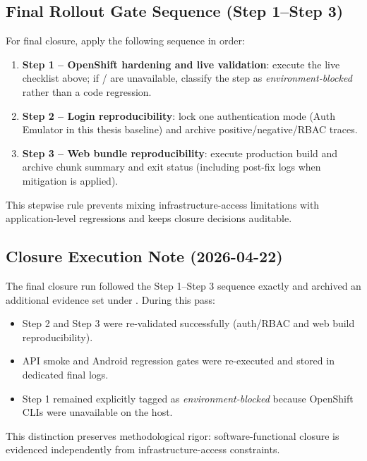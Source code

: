 \subsection{Final Rollout Gate Sequence (Step 1--Step 3)}
For final closure, apply the following sequence in order:
\begin{enumerate}
    \item \textbf{Step 1 -- OpenShift hardening and live validation}: execute the live checklist above; if / are unavailable, classify the step as \emph{environment-blocked} rather than a code regression.
    \item \textbf{Step 2 -- Login reproducibility}: lock one authentication mode (Auth Emulator in this thesis baseline) and archive positive/negative/RBAC traces.
    \item \textbf{Step 3 -- Web bundle reproducibility}: execute production build and archive chunk summary and exit status (including post-fix logs when mitigation is applied).
\end{enumerate}

This stepwise rule prevents mixing infrastructure-access limitations with application-level regressions and keeps closure decisions auditable.

\subsection{Closure Execution Note (2026-04-22)}
The final closure run followed the Step 1--Step 3 sequence exactly and archived an additional evidence set under . During this pass:
\begin{itemize}
    \item Step 2 and Step 3 were re-validated successfully (auth/RBAC and web build reproducibility).
    \item API smoke and Android regression gates were re-executed and stored in dedicated final logs.
    \item Step 1 remained explicitly tagged as \emph{environment-blocked} because OpenShift CLIs were unavailable on the host.
\end{itemize}

This distinction preserves methodological rigor: software-functional closure is evidenced independently from infrastructure-access constraints.

